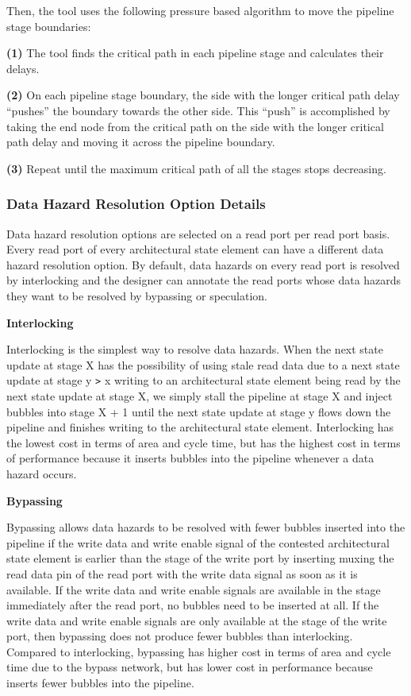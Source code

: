 Then, the tool uses the following pressure based algorithm to move the pipeline stage boundaries:

{\bf (1)} The tool finds the critical path in each pipeline stage and calculates their delays.

{\bf (2)} On each pipeline stage boundary, the side with the longer critical path delay ``pushes'' the boundary towards the other side. This ``push'' is accomplished by taking the end node from the critical path on the side with the longer critical path delay and moving it across the pipeline boundary.

{\bf (3)} Repeat until the maximum critical path of all the stages stops decreasing.

\subsubsection{Data Hazard Resolution Option Details}
\label{section:logicGen}
Data hazard resolution options are selected on a read port per read port basis. Every read port of every architectural state element can have a different data hazard resolution option. By default, data hazards on every read port is resolved by interlocking and the designer can annotate the read ports whose data hazards they want to be resolved by bypassing or speculation.

{\bf Interlocking}

Interlocking is the simplest way to resolve data hazards. When the next state update at stage X has the possibility of using stale read data due to a next state update at stage y {\tt >} x writing to an architectural state element being read by the next state update at stage X, we simply stall the pipeline at stage X and inject bubbles into stage X + 1 until the next state update at stage y flows down the pipeline and finishes writing to the architectural state element. Interlocking has the lowest cost in terms of area and cycle time, but has the highest cost in terms of performance because it inserts bubbles into the pipeline whenever a data hazard occurs.

{\bf Bypassing}

Bypassing allows data hazards to be resolved with fewer bubbles inserted into the pipeline if the write data and write enable signal of the contested architectural state element is earlier than the stage of the write port by inserting muxing the read data pin of the read port with the write data signal as soon as it is available. If the write data and write enable signals are available in the stage immediately after the read port, no bubbles need to be inserted at all. If the write data and write enable signals are only available at the stage of the write port, then bypassing does not produce fewer bubbles than interlocking. Compared to interlocking, bypassing has higher cost in terms of area and cycle time due to the bypass network, but has lower cost in performance because inserts fewer bubbles into the pipeline.

